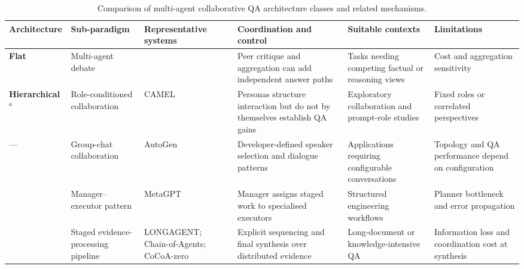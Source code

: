 \begin{table}[pos=t]
  \centering
  \caption{Comparison of multi-agent collaborative QA architecture classes and related mechanisms.}
  \label{tab:9categories}
  \scriptsize
  \begin{tabular}{>{\raggedright\arraybackslash}p{1.5cm} >{\raggedright\arraybackslash}p{2.0cm} >{\raggedright\arraybackslash}p{2.4cm} >{\raggedright\arraybackslash}p{3.2cm} >{\raggedright\arraybackslash}p{2.3cm} >{\raggedright\arraybackslash}p{2.2cm}}
    \toprule
    \textbf{Architecture} & \textbf{Sub-paradigm} &
    \textbf{Representative systems} &
    \textbf{Coordination and control} &
    \textbf{Suitable contexts} & \textbf{Limitations} \\
    \midrule
    \textbf{Flat} &
    Multi-agent debate & \citet{du2024multiagent_debate} &
    Peer critique and aggregation can add independent answer paths &
    Tasks needing competing factual or reasoning views &
    Cost and aggregation sensitivity \\
    \textbf{Hierarchical}$^{a}$ & Role-conditioned collaboration & CAMEL \citep{li2023camel} &
    Personas structure interaction but do not by themselves establish QA gains &
    Exploratory collaboration and prompt-role studies &
    Fixed roles or correlated perspectives \\
    --- & Group-chat collaboration & AutoGen \citep{wu2024autogen}  &
    Developer-defined speaker selection and dialogue patterns &
    Applications requiring configurable conversations &
    Topology and QA performance depend on configuration \\
    \midrule
    \multirow{2}{*}{\textbf{Hierarchical}} &
    Manager--executor pattern & MetaGPT \citep{hong2024metagpt}  &
    Manager assigns staged work to specialised executors &
    Structured engineering workflows &
    Planner bottleneck and error propagation \\
    & Staged evidence-processing pipeline & LONGAGENT; Chain-of-Agents; CoCoA-zero
    \citep{zhao2024longagent,zhang2024chain_agents,jiang2026cocoa}  &
    Explicit sequencing and final synthesis over distributed evidence &
    Long-document or knowledge-intensive QA &
    Information loss and coordination cost at synthesis \\


\end{tabular}
\end{table}
